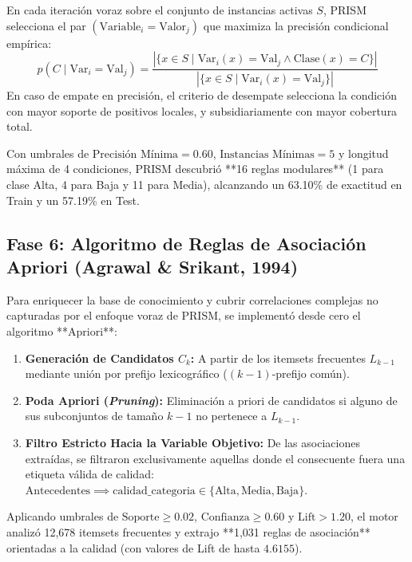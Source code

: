 \documentclass[11pt,a4paper]{article}
\begin{document}
En cada iteración voraz sobre el conjunto de instancias activas $S$, PRISM selecciona el par $(\text{Variable}_i = \text{Valor}_j)$ que maximiza la precisión condicional empírica:
\begin{equation}
p(C \mid \text{Var}_i = \text{Val}_j) = \frac{|\{x \in S \mid \text{Var}_i(x) = \text{Val}_j \land \text{Clase}(x) = C\}|}{|\{x \in S \mid \text{Var}_i(x) = \text{Val}_j\}|}
\end{equation}
En caso de empate en precisión, el criterio de desempate selecciona la condición con mayor soporte de positivos locales, y subsidiariamente con mayor cobertura total.

Con umbrales de $\text{Precisión Mínima} = 0.60$, $\text{Instancias Mínimas} = 5$ y longitud máxima de 4 condiciones, PRISM descubrió **16 reglas modulares** (1 para clase Alta, 4 para Baja y 11 para Media), alcanzando un 63.10\% de exactitud en Train y un 57.19\% en Test.

\subsection{Fase 6: Algoritmo de Reglas de Asociación Apriori (Agrawal \& Srikant, 1994)}
Para enriquecer la base de conocimiento y cubrir correlaciones complejas no capturadas por el enfoque voraz de PRISM, se implementó desde cero el algoritmo **Apriori**:
\begin{enumerate}[noitemsep]
    \item \textbf{Generación de Candidatos $C_k$:} A partir de los itemsets frecuentes $L_{k-1}$ mediante unión por prefijo lexicográfico ($(k-1)$-prefijo común).
    \item \textbf{Poda Apriori (\textit{Pruning}):} Eliminación a priori de candidatos si alguno de sus subconjuntos de tamaño $k-1$ no pertenece a $L_{k-1}$.
    \item \textbf{Filtro Estricto Hacia la Variable Objetivo:} De las asociaciones extraídas, se filtraron exclusivamente aquellas donde el consecuente fuera una etiqueta válida de calidad: $\text{Antecedentes} \implies \text{calidad\_categoria} \in \{\text{Alta}, \text{Media}, \text{Baja}\}$.
\end{enumerate}

Aplicando umbrales de $\text{Soporte} \ge 0.02$, $\text{Confianza} \ge 0.60$ y $\text{Lift} > 1.20$, el motor analizó 12,678 itemsets frecuentes y extrajo **1,031 reglas de asociación** orientadas a la calidad (con valores de Lift de hasta $4.6155$).
\end{document}
